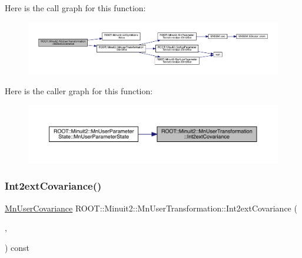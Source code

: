 Here is the call graph for this function\+:\nopagebreak
\begin{figure}[H]
\begin{center}
\leavevmode
\includegraphics[width=350pt]{d9/d98/classROOT_1_1Minuit2_1_1MnUserTransformation_a10f2146be0a2c991243dd2f70a943a15_cgraph}
\end{center}
\end{figure}
Here is the caller graph for this function\+:\nopagebreak
\begin{figure}[H]
\begin{center}
\leavevmode
\includegraphics[width=350pt]{d9/d98/classROOT_1_1Minuit2_1_1MnUserTransformation_a10f2146be0a2c991243dd2f70a943a15_icgraph}
\end{center}
\end{figure}
\mbox{\label{classROOT_1_1Minuit2_1_1MnUserTransformation_a10f2146be0a2c991243dd2f70a943a15}} 
\subsubsection{\texorpdfstring{Int2extCovariance()}{Int2extCovariance()}\hspace{0.1cm}{\footnotesize\ttfamily [2/2]}}
{\footnotesize\ttfamily \mbox{\hyperlink{classROOT_1_1Minuit2_1_1MnUserCovariance}{Mn\+User\+Covariance}} R\+O\+O\+T\+::\+Minuit2\+::\+Mn\+User\+Transformation\+::\+Int2ext\+Covariance (\begin{DoxyParamCaption}\item[{const \mbox{\hyperlink{namespaceROOT_1_1Minuit2_a62ed97730a1ca8d3fbaec64a19aa11c9}{Mn\+Algebraic\+Vector}} \&}]{,  }\item[{const \mbox{\hyperlink{namespaceROOT_1_1Minuit2_a9e74ad97f5537a2e80e52b04d98ecc6e}{Mn\+Algebraic\+Sym\+Matrix}} \&}]{ }\end{DoxyParamCaption}) const}

